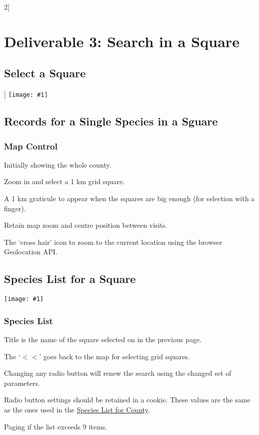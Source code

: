 \documentclass[a4paper,12pt,landscape]{article}
\newcommand{\wireframe}[1]{\texttt{[image: \#1]}\clearpage}
\begin{document}
\begin{multicols*}{2}[%
  \section{Deliverable 3: Search in a Square}%
  \subsection{Select a Square}%
]
\thispagestyle{empty}
\wireframe{./wireframes/Squares__Index.png}%

\subsection{Records for a Single Species in a Sguare}

\subsubsection*{Map Control}

\begin{todolist}
  \item Initially showing the whole county.
  \item Zoom in and select a 1 km grid square.
  \item A 1 km graticule to appear when the squares are big enough (for selection with a finger).
  \item Retain map zoom and centre position between visits.
  \item The `cross hair' icon to zoom to the current location using the browser Geolocation API.
\end{todolist}

\clearpage

\subsection{Species List for a Square}

\wireframe{./wireframes/Species__ListForSquare.png}%

\subsubsection*{Species List}

\begin{todolist}
  \item Title is the name of the square selected on in the previous page.
  \item The `$<<$' goes back to the map for selecting grid squares.
  \item Changing any radio button will renew the search using the changed set of parameters.
  \item Radio button settings should be retained in a cookie.
    These values are the same as the ones used in the \hyperref[sec:species-list-for-county]{Species List for County}.
  \item Paging if the list exceeds 9 items.
  \end{todolist}


\end{multicols*}
\end{document}
